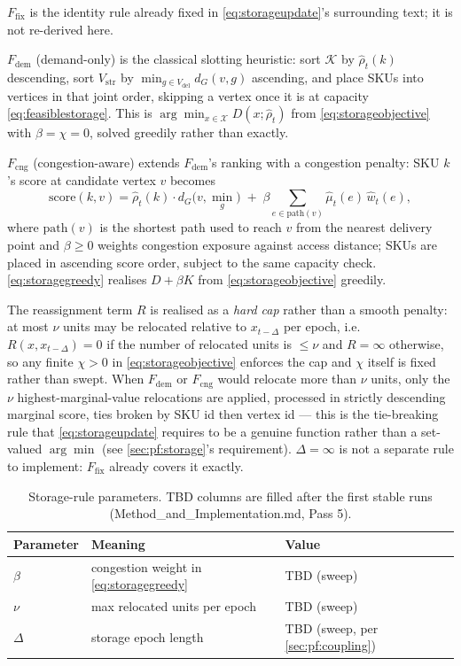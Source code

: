 \documentclass[../main.tex]{subfiles}
\begin{document}
\textbf{$F_{\mathrm{fix}}$} is the identity rule already fixed in
\eqref{eq:storageupdate}'s surrounding text; it is not re-derived here.

\textbf{$F_{\mathrm{dem}}$} (demand-only) is the classical slotting
heuristic: sort $\mathcal{K}$ by $\hat\rho_t(k)$ descending, sort
$V_{\mathrm{str}}$ by $\min_{g\in V_{\mathrm{del}}} d_G(v,g)$ ascending, and
place SKUs into vertices in that joint order, skipping a vertex once it is at
capacity \eqref{eq:feasiblestorage}. This is $\arg\min_{x\in\mathcal{X}}
D(x;\hat\rho_t)$ from \eqref{eq:storageobjective} with $\beta=\chi=0$, solved
greedily rather than exactly.

\textbf{$F_{\mathrm{cng}}$} (congestion-aware) extends $F_{\mathrm{dem}}$'s
ranking with a congestion penalty: SKU $k$'s score at candidate vertex $v$
becomes
\begin{equation}
  \mathrm{score}(k,v) = \hat\rho_t(k)\cdot d_G\bigl(v, \textstyle\min_{g}\bigr)
  \;+\; \beta \sum_{e \in \mathrm{path}(v)} \hat\mu_t(e)\,\hat w_t(e) ,
  \label{eq:storagegreedy}
\end{equation}
where $\mathrm{path}(v)$ is the shortest path used to reach $v$ from the
nearest delivery point and $\beta \ge 0$ weights congestion exposure against
access distance; SKUs are placed in ascending score order, subject to the same
capacity check. \eqref{eq:storagegreedy} realises $D+\beta K$ from
\eqref{eq:storageobjective} greedily.

The reassignment term $R$ is realised as a \emph{hard cap} rather than a
smooth penalty: at most $\nu$ units may be relocated relative to
$x_{t-\Delta}$ per epoch, i.e.\ $R(x,x_{t-\Delta}) = 0$ if the number of
relocated units is $\le \nu$ and $R = \infty$ otherwise, so any finite
$\chi > 0$ in \eqref{eq:storageobjective} enforces the cap and $\chi$ itself
is fixed rather than swept. When $F_{\mathrm{dem}}$ or $F_{\mathrm{cng}}$
would relocate more than $\nu$ units, only the $\nu$
highest-marginal-value relocations are applied, processed in strictly
descending marginal score, ties broken by SKU id then vertex id --- this is
the tie-breaking rule that \eqref{eq:storageupdate} requires to be a genuine
function rather than a set-valued $\arg\min$ (see \ref{sec:pf:storage}'s
requirement). $\Delta=\infty$ is not a separate rule to implement:
$F_{\mathrm{fix}}$ already covers it exactly.

\begin{table}[h]
  \centering
  \caption{Storage-rule parameters. TBD columns are filled after the first
  stable runs (Method\_and\_Implementation.md, Pass 5).}
  \label{tab:storageparams}
  \begin{tabular}{lll}
    \toprule
    Parameter & Meaning & Value \\
    \midrule
    $\beta$ & congestion weight in \eqref{eq:storagegreedy} & TBD (sweep) \\
    $\nu$ & max relocated units per epoch & TBD (sweep) \\
    $\Delta$ & storage epoch length & TBD (sweep, per \ref{sec:pf:coupling}) \\
    \bottomrule
  \end{tabular}
\end{table}
\end{document}
